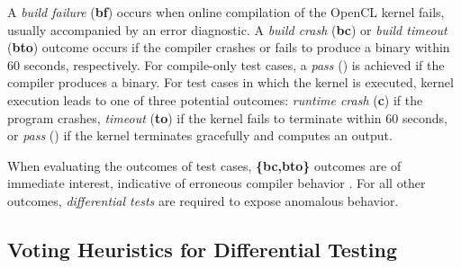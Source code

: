 A \emph{build failure} (\textbf{bf}) occurs when online compilation of the OpenCL kernel fails, usually accompanied by an error diagnostic. A \emph{build crash} (\textbf{bc}) or \emph{build timeout} (\textbf{bto}) outcome occurs if the compiler crashes or fails to produce a binary within 60 seconds, respectively. For compile-only test cases, a \emph{pass} (\textbf{\cmark}) is achieved if the compiler produces a binary. For test cases in which the kernel is executed, kernel execution leads to one of three potential outcomes: \emph{runtime crash} (\textbf{c}) if the program crashes, \emph{timeout} (\textbf{to}) if the kernel fails to terminate within 60 seconds, or \emph{pass} (\textbf{\cmark}) if the kernel terminates gracefully and computes an output.
%

When evaluating the outcomes of test cases, \textbf{\{bc,bto\}} outcomes are of immediate interest, indicative of erroneous compiler behavior . For all other outcomes, \emph{differential tests} are required to expose anomalous behavior.


\subsection{Voting Heuristics for Differential Testing}

